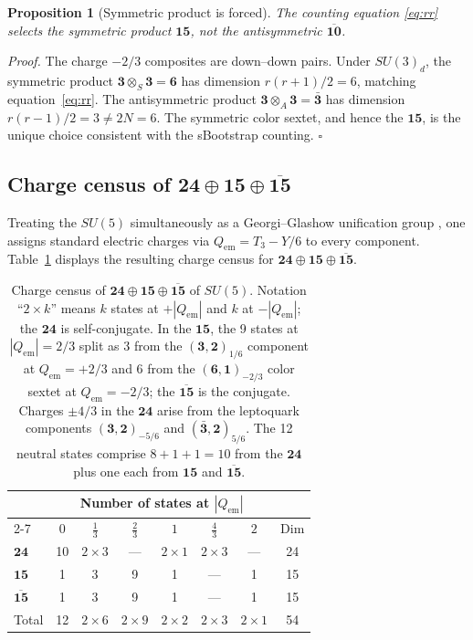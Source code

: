 \documentclass[12pt,a4paper]{article}
\begin{document}
\medskip
\noindent\textbf{Proposition 1} (Symmetric product is forced).
\textit{The counting equation \eqref{eq:rr} selects the
symmetric product $\mathbf{15}$, not the antisymmetric
$\overline{\mathbf{10}}$.}

\medskip
\noindent\textit{Proof.}
The charge $-2/3$ composites are down--down pairs.
Under $SU(3)_d$, the symmetric product
$\mathbf{3} \otimes_S \mathbf{3} = \mathbf{6}$ has dimension
$r(r+1)/2 = 6$, matching equation~\eqref{eq:rr}.  The antisymmetric
product $\mathbf{3} \otimes_A \mathbf{3} = \bar{\mathbf{3}}$ has
dimension $r(r-1)/2 = 3 \neq 2N = 6$.  The symmetric color sextet,
and hence the $\mathbf{15}$, is the unique choice consistent
with the sBootstrap counting.
\hfill$\square$

\subsection{Charge census of $\mathbf{24} \oplus \mathbf{15}
\oplus \overline{\mathbf{15}}$}
Treating the $SU(5)$ simultaneously as a Georgi--Glashow
unification group \cite{Rivero2005}, one assigns standard electric
charges via $Q_{\text{em}} = T_3 - Y/6$ to every component.
Table~\ref{tab:census} displays the resulting charge census for
$\mathbf{24} \oplus \mathbf{15} \oplus \overline{\mathbf{15}}$.

\begin{table}[ht]
\centering
\begin{tabular}{lcccccc@{\qquad}c}
\toprule
& \multicolumn{6}{c}{Number of states at $|Q_{\text{em}}|$} & \\
\cmidrule(lr){2-7}
& $0$ & $\tfrac{1}{3}$ & $\tfrac{2}{3}$ & $1$
& $\tfrac{4}{3}$ & $2$ & Dim \\
\midrule
$\mathbf{24}$ & 10 & $2\!\times\!3$ & ---
& $2\!\times\!1$ & $2\!\times\!3$ & --- & 24 \\[2pt]
$\mathbf{15}$ & 1 & 3 & 9
& 1 & --- & 1 & 15 \\[2pt]
$\overline{\mathbf{15}}$ & 1 & 3 & 9
& 1 & --- & 1 & 15 \\[2pt]
\midrule
Total & 12 & $2\!\times\!6$ & $2\!\times\!9$
& $2\!\times\!2$ & $2\!\times\!3$ & $2\!\times\!1$ & 54 \\
\bottomrule
\end{tabular}
\caption{Charge census of
$\mathbf{24} \oplus \mathbf{15} \oplus \overline{\mathbf{15}}$
of $SU(5)$.
Notation ``$2\!\times\!k$'' means $k$ states at $+|Q_{\text{em}}|$ and $k$
at $-|Q_{\text{em}}|$; the $\mathbf{24}$ is self-conjugate.  In the
$\mathbf{15}$, the 9 states at $|Q_{\text{em}}|=2/3$ split as 3 from the
$(\mathbf{3},\mathbf{2})_{1/6}$ component at $Q_{\text{em}} = +2/3$ and 6
from the $(\mathbf{6},\mathbf{1})_{-2/3}$ color sextet at
$Q_{\text{em}} = -2/3$; the $\overline{\mathbf{15}}$ is the conjugate.
Charges $\pm 4/3$ in the $\mathbf{24}$ arise from the leptoquark
components $(\mathbf{3},\mathbf{2})_{-5/6}$ and
$(\bar{\mathbf{3}},\mathbf{2})_{5/6}$.
The 12 neutral states comprise $8 + 1 + 1 = 10$ from the
$\mathbf{24}$ plus one each from $\mathbf{15}$ and
$\overline{\mathbf{15}}$.}
\label{tab:census}
\end{table}
\end{document}
